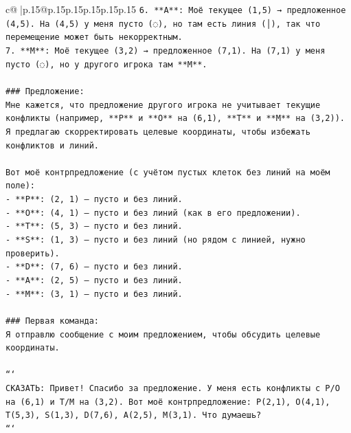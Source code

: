 \documentclass{article}
\begin{document}
{\begin{supertabular}{c@{$\;$}|p{.15\linewidth}@{}p{.15\linewidth}p{.15\linewidth}p{.15\linewidth}p{.15\linewidth}p{.15\linewidth}}
{{{\texttt{6. **A**: Моё текущее (1,5) → предложенное (4,5). На (4,5) у меня пусто (◌), но там есть линия (│), так что перемещение может быть некорректным.} \\
\texttt{7. **M**: Моё текущее (3,2) → предложенное (7,1). На (7,1) у меня пусто (◌), но у другого игрока там **M**.} \\
\\ 
\texttt{\#\#\# Предложение:} \\
\texttt{Мне кажется, что предложение другого игрока не учитывает текущие конфликты (например, **P** и **O** на (6,1), **T** и **M** на (3,2)). Я предлагаю скорректировать целевые координаты, чтобы избежать конфликтов и линий.} \\
\\ 
\texttt{Вот моё контрпредложение (с учётом пустых клеток без линий на моём поле):} \\
\texttt{{-} **P**: (2, 1) — пусто и без линий.} \\
\texttt{{-} **O**: (4, 1) — пусто и без линий (как в его предложении).} \\
\texttt{{-} **T**: (5, 3) — пусто и без линий.} \\
\texttt{{-} **S**: (1, 3) — пусто и без линий (но рядом с линией, нужно проверить).} \\
\texttt{{-} **D**: (7, 6) — пусто и без линий.} \\
\texttt{{-} **A**: (2, 5) — пусто и без линий.} \\
\texttt{{-} **M**: (3, 1) — пусто и без линий.} \\
\\ 
\texttt{\#\#\# Первая команда:} \\
\texttt{Я отправлю сообщение с моим предложением, чтобы обсудить целевые координаты.} \\
\\ 
\texttt{```} \\
\texttt{СКАЗАТЬ: Привет! Спасибо за предложение. У меня есть конфликты с P/O на (6,1) и T/M на (3,2). Вот моё контрпредложение: P(2,1), O(4,1), T(5,3), S(1,3), D(7,6), A(2,5), M(3,1). Что думаешь?} \\
\texttt{```} \\
            }
        }
    }
     \\ \\


\end{supertabular}}
\end{document}
